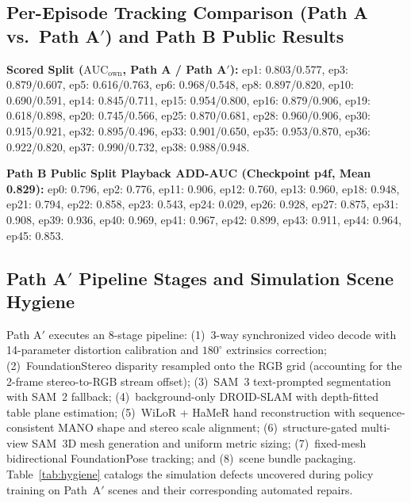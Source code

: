 \documentclass[10pt]{nvidiaextabstract}
\newcommand{\ownauc}{\ensuremath{\mathrm{AUC}_{\text{own}}}\xspace}
\begin{document}
\subsection{Per-Episode Tracking Comparison (Path A vs.\ Path A$'$) and Path B Public Results}
\textbf{Scored Split ($\ownauc$, Path A / Path A$'$):} ep1: 0.803/0.577, ep3: 0.879/0.607, ep5: 0.616/0.763, ep6: 0.968/0.548, ep8: 0.897/0.820, ep10: 0.690/0.591, ep14: 0.845/0.711, ep15: 0.954/0.800, ep16: 0.879/0.906, ep19: 0.618/0.898, ep20: 0.745/0.566, ep25: 0.870/0.681, ep28: 0.960/0.906, ep30: 0.915/0.921, ep32: 0.895/0.496, ep33: 0.901/0.650, ep35: 0.953/0.870, ep36: 0.922/0.820, ep37: 0.990/0.732, ep38: 0.988/0.948.

\textbf{Path B Public Split Playback ADD-AUC (Checkpoint p4f, Mean 0.829):} ep0: 0.796, ep2: 0.776, ep11: 0.906, ep12: 0.760, ep13: 0.960, ep18: 0.948, ep21: 0.794, ep22: 0.858, ep23: 0.543, ep24: 0.029, ep26: 0.928, ep27: 0.875, ep31: 0.908, ep39: 0.936, ep40: 0.969, ep41: 0.967, ep42: 0.899, ep43: 0.911, ep44: 0.964, ep45: 0.853.

\subsection{Path A$'$ Pipeline Stages and Simulation Scene Hygiene}
\label{app:patha-prime}
Path A$'$ executes an 8-stage pipeline: (1)~3-way synchronized video decode with 14-parameter distortion calibration and $180^\circ$ extrinsics correction; (2)~FoundationStereo disparity resampled onto the RGB grid (accounting for the 2-frame stereo-to-RGB stream offset); (3)~SAM~3 text-prompted segmentation with SAM~2 fallback; (4)~background-only DROID-SLAM with depth-fitted table plane estimation; (5)~WiLoR + HaMeR hand reconstruction with sequence-consistent MANO shape and stereo scale alignment; (6)~structure-gated multi-view SAM~3D mesh generation and uniform metric sizing; (7)~fixed-mesh bidirectional FoundationPose tracking; and (8)~scene bundle packaging. Table~\ref{tab:hygiene} catalogs the simulation defects uncovered during policy training on Path~A$'$ scenes and their corresponding automated repairs.
\end{document}
